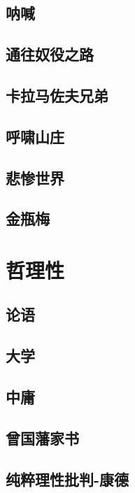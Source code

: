 \documentclass[UTF8,a4paper,12pt]{ctexbook}
\begin{document}
	\section{呐喊}
	
	\section{通往奴役之路}
	
	\section{卡拉马佐夫兄弟}
	
	\section{呼啸山庄}
	
	\section{悲惨世界}
	
	\section{金瓶梅}
	
\chapter{哲理性}
	\section{论语}

	\section{大学}
	
	\section{中庸}
	
	\section{曾国藩家书}
	
	\section{纯粹理性批判-康德}
	
\end{document}

